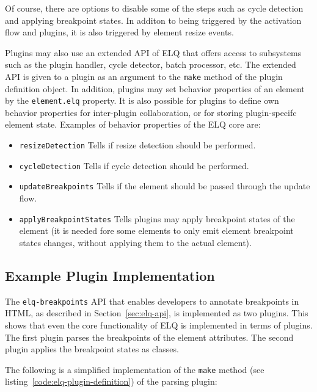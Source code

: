 \documentclass{acm_proc_article-sp}
\newcommand{\code}[1]{\texttt{#1}}
\newcommand{\elq}{ELQ}
\begin{document}
  Of course, there are options to disable some of the steps such as cycle detection and applying breakpoint states.
  In additon to being triggered by the activation flow and plugins, it is also triggered by element resize events.

  Plugins may also use an extended API of \elq{} that offers access to subsystems such as the plugin handler, cycle detector, batch processor, etc.
  The extended API is given to a plugin as an argument to the \code{make} method of the plugin definition object.
  In addition, plugins may set behavior properties of an element by the \code{element.elq} property.
  It is also possible for plugins to define own behavior properties for inter-plugin collaboration, or for storing plugin-specifc element state.
  Examples of behavior properties of the \elq{} core are:
  \begin{itemize}
    \item \code{resizeDetection} Tells if resize detection should be performed.
    \item \code{cycleDetection} Tells if cycle detection should be performed.
    \item \code{updateBreakpoints} Tells if the element should be passed through the update flow.
    \item \code{applyBreakpointStates} Tells plugins may apply breakpoint states of the element (it is needed fore some elements to only emit element breakpoint states changes, without applying them to the actual element).
  \end{itemize}

  \subsection{Example Plugin Implementation}
    The \code{elq-breakpoints} API that enables developers to annotate breakpoints in HTML, as described in Section~\ref{sec:elq-api}, is implemented as two plugins.
    This shows that even the core functionality of \elq{} is implemented in terms of plugins.
    The first plugin parses the breakpoints of the element attributes.
    The second plugin applies the breakpoint states as classes.

    The following is a simplified implementation of the \code{make} method (see listing~\ref{code:elq-plugin-definition}) of the parsing plugin:
\end{document}
